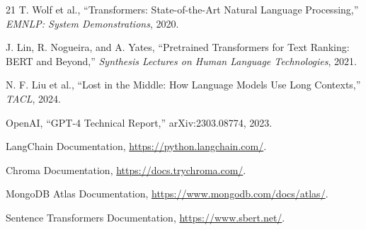 \documentclass[10pt,a4paper]{article}
\begin{document}
\begin{thebibliography}{21}
T. Wolf et al., ``Transformers: State-of-the-Art Natural Language Processing,'' \emph{EMNLP: System Demonstrations}, 2020.

J. Lin, R. Nogueira, and A. Yates, ``Pretrained Transformers for Text Ranking: BERT and Beyond,'' \emph{Synthesis Lectures on Human Language Technologies}, 2021.

N. F. Liu et al., ``Lost in the Middle: How Language Models Use Long Contexts,'' \emph{TACL}, 2024.

OpenAI, ``GPT-4 Technical Report,'' arXiv:2303.08774, 2023.

LangChain Documentation, \url{https://python.langchain.com/}.

Chroma Documentation, \url{https://docs.trychroma.com/}.

MongoDB Atlas Documentation, \url{https://www.mongodb.com/docs/atlas/}.

Sentence Transformers Documentation, \url{https://www.sbert.net/}.

\end{thebibliography}
\end{document}
